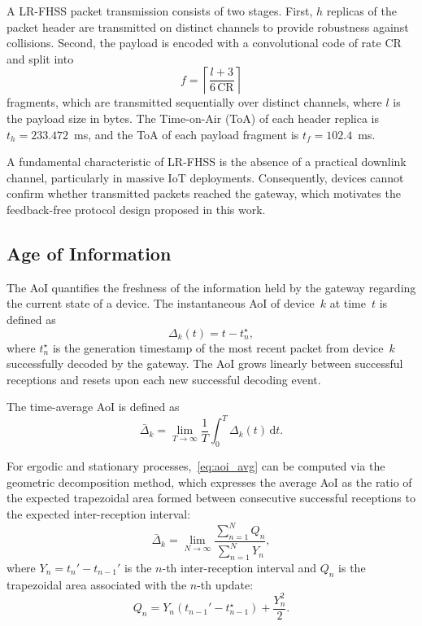 \documentclass[lettersize,journal]{IEEEtran}
\begin{document}
A \ac{LR-FHSS} packet transmission consists of two stages. First, $h$ replicas of the packet header are transmitted on distinct channels to provide robustness against collisions. Second, the payload is encoded with a convolutional code of rate $\mathrm{CR}$ and split into
\begin{equation}
  f = \left\lceil \frac{l + 3}{6\,\mathrm{CR}} \right\rceil
  \label{eq:fragments}
\end{equation}
fragments, which are transmitted sequentially over distinct channels, where $l$ is the payload size in bytes. The Time-on-Air (ToA) of each header replica is $t_h = 233.472$~ms, and the ToA of each payload fragment is $t_f = 102.4$~ms.

A fundamental characteristic of \ac{LR-FHSS} is the absence of a practical downlink channel, particularly in massive \ac{IoT} deployments. Consequently, devices cannot confirm whether transmitted packets reached the gateway, which motivates the feedback-free protocol design proposed in this work.

\subsection{Age of Information}
\label{subsec:aoi}

The \ac{AoI} quantifies the freshness of the information held by the gateway regarding the current state of a device. The instantaneous \ac{AoI} of device~$k$ at time~$t$ is defined as
\begin{equation}
  \Delta_k(t) = t - t_n^\star,
  \label{eq:aoi_inst}
\end{equation}
where $t_n^\star$ is the generation timestamp of the most recent packet from device~$k$ successfully decoded by the gateway. The \ac{AoI} grows linearly between successful receptions and resets upon each new successful decoding event.

The time-average \ac{AoI} is defined as
\begin{equation}
  \bar{\Delta}_k = \lim_{T \to \infty} \frac{1}{T}
    \int_0^T \Delta_k(t)\, \mathrm{d}t.
  \label{eq:aoi_avg}
\end{equation}

For ergodic and stationary processes,~\eqref{eq:aoi_avg} can be computed via the geometric decomposition method, which expresses the average \ac{AoI} as the ratio of the expected trapezoidal area formed between consecutive successful receptions to the expected inter-reception interval:
\begin{equation}
  \bar{\Delta}_k = \lim_{N \to \infty}
    \frac{\sum_{n=1}^{N} Q_n}{\sum_{n=1}^{N} Y_n},
  \label{eq:aoi_geometric}
\end{equation}
where $Y_n = t_n' - t_{n-1}'$ is the $n$-th inter-reception interval and $Q_n$ is the trapezoidal area associated with the $n$-th update:
\begin{equation}
  Q_n = Y_n \left(t_{n-1}' - t_{n-1}^\star\right) + \frac{Y_n^2}{2}.
  \label{eq:Qn}
\end{equation}
\end{document}
